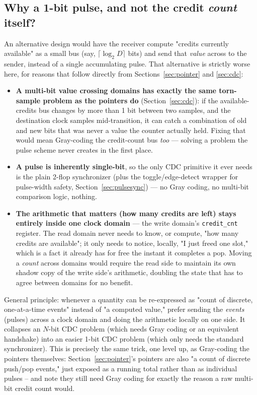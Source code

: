 \documentclass[12pt]{article}
\begin{document}
\subsection{Why a 1-bit pulse, and not the credit \emph{count} itself?}

An alternative design would have the receiver compute "credits currently
available" as a small bus (say, $\lceil\log_2 D\rceil$ bits) and send that
\emph{value} across to the sender, instead of a single accumulating pulse.
That alternative is strictly worse here, for reasons that follow directly
from Sections~\ref{sec:pointer} and \ref{sec:cdc}:

\begin{itemize}[leftmargin=1.4em]
  \item \textbf{A multi-bit value crossing domains has exactly the same
  torn-sample problem as the pointers do} (Section~\ref{sec:cdc}): if the
  available-credits bus changes by more than 1 bit between two samples,
  and the destination clock samples mid-transition, it can catch a
  combination of old and new bits that was never a value the counter
  actually held. Fixing that would mean Gray-coding the credit-count bus
  \emph{too} — solving a problem the pulse scheme never creates in the
  first place.
  \item \textbf{A pulse is inherently single-bit}, so the only CDC
  primitive it ever needs is the plain 2-flop synchronizer (plus the
  toggle/edge-detect wrapper for pulse-width safety, Section~\ref{sec:pulsesync}) — no
  Gray coding, no multi-bit comparison logic, nothing.
  \item \textbf{The arithmetic that matters (how many credits are left)
  stays entirely inside one clock domain} — the write domain's
  \texttt{credit\_cnt} register. The read domain never needs to know, or
  compute, "how many credits are available"; it only needs to notice,
  locally, "I just freed one slot," which is a fact it already has for
  free the instant it completes a pop. Moving a \emph{count} across
  domains would require the read side to maintain its own shadow copy of
  the write side's arithmetic, doubling the state that has to agree
  between domains for no benefit.
\end{itemize}

\begin{keybox}
General principle: whenever a quantity can be re-expressed as "count of
discrete, one-at-a-time events" instead of "a computed value," prefer
sending the \emph{events} (pulses) across a clock domain and doing the
arithmetic locally on one side. It collapses an $N$-bit CDC problem (which
needs Gray coding or an equivalent handshake) into an easier 1-bit CDC
problem (which only needs the standard synchronizer). This is precisely
the same trick, one level up, as Gray-coding the pointers themselves:
Section~\ref{sec:pointer}'s pointers are also "a count of discrete
push/pop events," just exposed as a running total rather than as
individual pulses -- and note they still need Gray coding for exactly the
reason a raw multi-bit credit count would.
\end{keybox}
\end{document}
